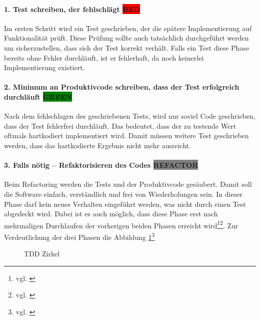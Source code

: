 \paragraph{1. Test schreiben, der fehlschlägt \colorbox{red}{RED}}
Im ersten Schritt wird ein Test geschrieben, der die spätere Implementierung auf Funktionalität prüft. Diese Prüfung sollte auch tatsächlich durchgeführt werden um sicherzustellen, dass sich der Test korrekt verhält. Falls ein Test diese Phase bereits ohne Fehler durchläuft, ist er fehlerhaft, da noch keinerlei Implementierung existiert.
\paragraph{2. Minimum an Produktivcode schreiben, dass der Test erfolgreich durchläuft \colorbox{green}{GREEN}}
Nach dem fehlschlagen des geschriebenen Tests, wird nur soviel Code geschrieben, dass der Test fehlerfrei durchläuft. 
Das bedeutet, dass der zu testende Wert oftmals hartkodiert implementiert wird. Damit müssen weitere Test geschrieben werden, dass das hartkodierte Ergebnis nicht mehr ausreicht.
\paragraph{3. Falls nötig – Refaktorisieren des Codes \colorbox{gray}{REFACTOR}}
Beim Refactoring werden die Tests und der Produktivcode gesäubert. Damit soll die Software einfach, verständlich und frei von Wiederholungen sein. In dieser Phase darf kein neues Verhalten eingeführt werden, was nicht durch einen Test abgedeckt wird. Dabei ist es auch möglich, dass diese Phase erst nach mehrmaligen Durchlaufen der vorherigen beiden Phasen erreicht wird\footnote{vgl. \cite{tdd-ryte}}\footnote{vgl. \cite{tdd-improuv}}.
Zur Verdeutlichung der drei Phasen die Abbildung \ref{fig:tddcircle}\footnote{vgl. \cite{tddcircle}}
\begin{figure}[htb]
\centering
{}
\caption{TDD Zirkel}
\label{fig:tddcircle}%
\end{figure}